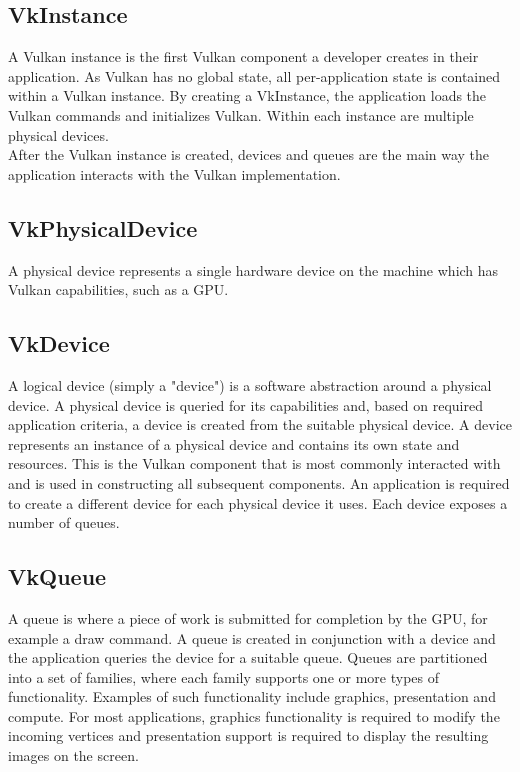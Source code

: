 \documentclass[12pt]{report}
\theoremstyle{definition}
\begin{document}
      \subsection{VkInstance}
      
        A Vulkan instance is the first Vulkan component a developer creates in
        their application.  As Vulkan has no global state, all per-application
        state is contained within a Vulkan instance. By creating a VkInstance,
        the application loads the Vulkan commands and initializes Vulkan.
        Within each instance are multiple physical devices. \\

        After the Vulkan instance is created, devices and queues are the main
        way the application interacts with the Vulkan implementation.

      \subsection{VkPhysicalDevice}

        A physical device represents a single hardware device on the machine
        which has Vulkan capabilities, such as a GPU.

      \subsection{VkDevice}

        A logical device (simply a "device") is a software abstraction around a
        physical device. A physical device is queried for its capabilities and,
        based on required application criteria, a device is created from the
        suitable physical device. A device represents an instance of a
        physical device and contains its own state and resources. This is
        the Vulkan component that is most commonly interacted with and is
        used in constructing all subsequent components. An application is
        required to create a different device for each physical device it uses.
        Each device exposes a number of queues.

      \subsection{VkQueue}

        A queue is where a piece of work is submitted for completion by the GPU,
        for example a draw command. A queue is created in conjunction with a
        device and the application queries the device for a suitable queue.
        Queues are partitioned into a set of families, where each family
        supports one or more types of functionality. Examples of such
        functionality include graphics, presentation and compute. For most
        applications, graphics functionality is required to modify the
        incoming vertices and presentation support is required to display
        the resulting images on the screen. 
\end{document}
